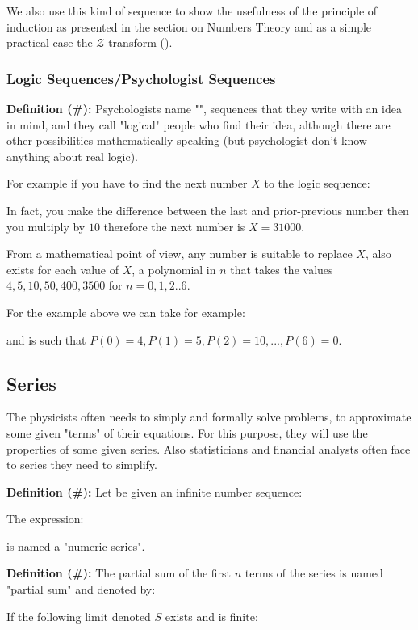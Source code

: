 We also use this kind of sequence to show the usefulness of the principle of induction as presented in the section on Numbers Theory and as a simple practical case the $\mathcal{Z}$ transform ().

	\subsubsection{Logic Sequences/Psychologist Sequences}
	\textbf{Definition (\#\mydef):} Psychologists name "", sequences that they write with an idea in mind, and they call "logical" people who find their idea, although there are other possibilities mathematically speaking (but psychologist don't know anything about real logic).
	
	For example if you have to find the next number $X$ to the logic sequence:
	
	In fact, you make the difference between the last and prior-previous number then you multiply by $10$ therefore the next number is $X=31000$.
	
	From a mathematical point of view, any number is suitable to replace $X$, also exists for each value of $X$, a polynomial in $n$ that takes the values $4, 5, 10, 50, 400, 3500$ for $n = 0, 1 , 2 ..6$.
	
	For the example above we can take for example:
	
	and is such that $P(0)=4, P(1)=5, P(2)=10, ...,P(6)=0$.

	\pagebreak
	\subsection{Series}

The physicists often needs to simply and formally solve problems, to approximate some given "terms" of their equations. For this purpose, they will use the properties of some given series. Also statisticians and financial analysts often face to series they need to simplify.

\textbf{Definition (\#\mydef):} Let be given an infinite number sequence:
	
	The expression:
	
	is named a "numeric series".
	
	\textbf{Definition (\#\mydef):} The partial sum of the first $n$ terms of the series is named "partial sum" and denoted by:
	
	If the following limit denoted $S$ exists and is finite:
	
